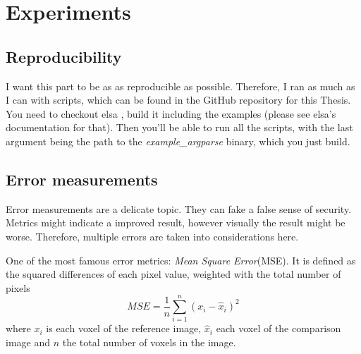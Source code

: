 \chapter{Experiments}\label{chap:experiments}

\section{Reproducibility}\label{sec:experiments_repoduction}

I want this part to be as as reproducible as possible. Therefore, I ran as much as I can with
scripts, which can be found in the GitHub repository for this Thesis. You need to checkout elsa
, build it including the examples (please see elsa's documentation for that).
Then you'll be able to run all the scripts, with the last argument being the path to the
\textit{example\_argparse} binary, which you just build.

\section{Error measurements}\label{sec:error_measurements}

Error measurements are a delicate topic. They can fake a false sense of security. Metrics might
indicate a improved result, however visually the result might be worse. Therefore, multiple errors
are taken into considerations here.

\begin{definition}
	One of the most famous error metrics: \textit{Mean Square Error}(MSE). It is defined as the
	squared differences of each pixel value, weighted with the total number of pixels
	\[ MSE = \frac{1}{n} \sum_{i=1}^{n}(x_i - \hat{x}_i)^2\]
	where \(x_i\) is each voxel of the reference image, \(\hat{x}_i\) each voxel of the comparison
	image and \(n\) the total number of voxels in the image.
\end{definition}

